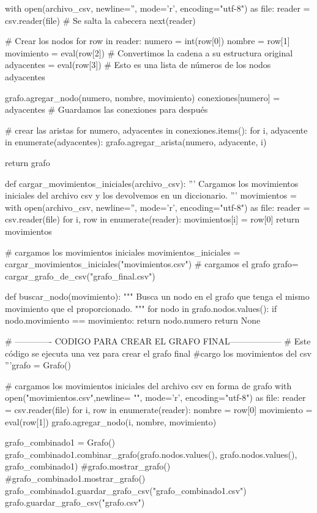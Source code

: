    with open(archivo_csv, newline='', mode='r', encoding="utf-8") as file:
        reader = csv.reader(file)
        # Se salta la cabecera
        next(reader)

        # Crear los nodos
        for row in reader:
            numero = int(row[0])
            nombre = row[1]
            movimiento = eval(row[2])  # Convertimos la cadena a su estructura original 
            adyacentes = eval(row[3])  # Esto es una lista de números de los nodos adyacentes
            
            grafo.agregar_nodo(numero, nombre, movimiento)
            conexiones[numero] = adyacentes # Guardamos las conexiones para después

        # crear las aristas
        for numero, adyacentes in conexiones.items():
            for i, adyacente in enumerate(adyacentes):
                grafo.agregar_arista(numero, adyacente, i)                
    
    return grafo


def cargar_movimientos_iniciales(archivo_csv):
    '''
    Cargamos los movimientos iniciales del archivo csv y los devolvemos en un diccionario.
    '''
    movimientos = {}
    with open(archivo_csv, newline='', mode='r', encoding="utf-8") as file:
        reader = csv.reader(file)
        for i, row in enumerate(reader):
            movimientos[i] = row[0]
    return movimientos


# cargamos los movimientos iniciales
movimientos_iniciales = cargar_movimientos_iniciales("movimientos.csv")
# cargamos el grafo
grafo= cargar_grafo_de_csv("grafo_final.csv")

def buscar_nodo(movimiento):
    """
    Busca un nodo en el grafo que tenga el mismo movimiento que el proporcionado.
    """
    for nodo in grafo.nodos.values():
        if nodo.movimiento == movimiento:
            return nodo.numero
    return None
        
# ------------- CODIGO PARA CREAR EL GRAFO FINAL------------------
# Este código se ejecuta una vez para crear el grafo final
#cargo los movimientos del csv
'''grafo = Grafo()

# cargamos los movimientos iniciales del archivo csv en forma de grafo
with open("movimientos.csv",newline= "", mode='r', encoding="utf-8") as file:
    reader = csv.reader(file)
    for i, row in enumerate(reader):
        nombre = row[0]
        movimiento = eval(row[1])
        grafo.agregar_nodo(i, nombre, movimiento)
        

grafo_combinado1 = Grafo()
grafo_combinado1.combinar_grafo(grafo.nodos.values(), grafo.nodos.values(), grafo_combinado1)
#grafo.mostrar_grafo()
#grafo_combinado1.mostrar_grafo()
grafo_combinado1.guardar_grafo_csv("grafo_combinado1.csv")
grafo.guardar_grafo_csv("grafo.csv")


